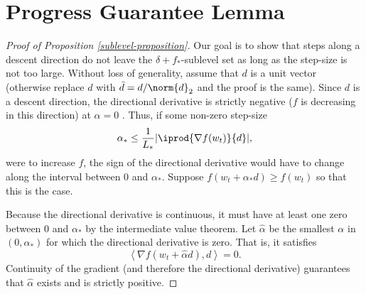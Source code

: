 \documentclass[10pt]{article} %
\newcommand{\abr}[1]{\left\langle#1\right\rangle}
\begin{document}
\section{Progress Guarantee Lemma}\label{progress-guarantees}
\begin{proof}[Proof of Proposition \ref{sublevel-proposition}]
    Our goal is to show that steps along a descent direction do not leave
    the \( \delta+f_* \)-sublevel set as long as the step-size is not too large.
    Without loss of generality, assume that \( d \) is a unit vector (otherwise
    replace \( d \) with \( \bar{d} = d / \norm{d}_2 \) and the proof is the same).
    Since \( d \) is a descent direction, the directional derivative
    is strictly negative ($f$ is decreasing in this direction) at \( \alpha = 0 \) .
    Thus, if some non-zero step-size 
    \[ 
        \alpha_* \leq \frac{1}{L_{*}}|\iprod{\nabla f(w_{t})}{d}|,
    \]
    were to increase \( f \), the
    sign of the directional derivative would have to change along the interval
    between \( 0 \) and \( \alpha_* \).
    Suppose \( f(w_t + \alpha_* d) \geq f(w_t) \) so that this is the case.

    Because the directional derivative is continuous, it must have at
    least one zero between \( 0 \) and \( \alpha_* \) by the intermediate value theorem.
    Let \( \hat{\alpha} \) be the smallest \( \alpha \) in \( (0, \alpha_*) \)
    for which the directional derivative is zero.
    That is, it satisfies
    \[
        \abr{\nabla f(w_t + \hat{\alpha} d), d} = 0.
    \]
    Continuity of the gradient (and therefore the directional derivative) 
    guarantees that \( \hat{\alpha} \) exists and is strictly positive.


\end{proof}
\end{document}
